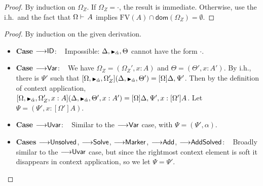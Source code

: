 \documentclass[a4paper]{article}
\newcommand{\smallblacktriangle}{\text{\textscale{0.7}{$\blacktriangleright$}}}
\def\CompactJudgments{0}
\newcommand{\entails}{\mathrel{\ifnum\CompactJudgments=1\vdash \else \vdash\,\fi}}
\newcommand{\MonnierCommaSym}{{\smallblacktriangle}}
\newcommand{\MonnierComma}[1]{{\MonnierCommaSym}_{#1}}
\newcommand{\FV}[1]{\mathrm{FV}(#1)}
\newcommand{\ProofCaseRule}[1]{\item \textbf{Case }\textrm{{#1}}: ~ }
\newcommand{\ProofCasesRules}[1]{\item \textbf{Cases }\textrm{{#1}}: ~ }
\newcommand{\xdom}{\mathsf{dom}}
\newcommand{\dom}[1]{\xdom(#1)}
\newcommand{\sect}{\mathrel{\cap}}
\newcommand{\extendssym}{\longrightarrow}
\newcommand{\judgetp}[2]{{#1} \entails {#2}}
\newcommand{\ahat}{\hat{\alpha}}
\newcommand{\rulename}[1]{\text{\normalfont\textsf{#1}}}
\newcommand{\substextendrulename}[1]{\ensuremath{{\extendssym}{\rulename{#1}}}\xspace}
\newcommand{\substextendId}{\substextendrulename{ID}}
\newcommand{\substextendUU}{\substextendrulename{Uvar}}
\newcommand{\substextendVV}{\substextendrulename{Var}}
\newcommand{\substextendEE}{\substextendrulename{Unsolved}}
\newcommand{\substextendMonMon}{\substextendrulename{Marker}}
\newcommand{\substextendSolve}{\substextendrulename{Solve}}
\newcommand{\substextendAdd}{\substextendrulename{Add}}
\newcommand{\substextendAddSolved}{\substextendrulename{AddSolved}}
\begin{document}
\substitutionstability*
\begin{proof}
  By induction on $\Omega_Z$.
If $\Omega_Z = \cdot$, the result is immediate.
  Otherwise, use the i.h.\ and the fact that
  $\judgetp{\Omega}{A}$ implies $\FV{A} \sect \dom{\Omega_Z} = \emptyset$.
\end{proof}

\contextpartitioning*
\begin{proof}
  By induction on the given derivation.
  
  \begin{itemize}
      \ProofCaseRule{\substextendId}   Impossible: $\Delta, \MonnierComma{\ahat}, \Theta$ cannot have the form $\cdot$.

      \ProofCaseRule{\substextendVV}  We have $\Omega_Z = (\Omega_Z', x : A)$ and $\Theta = (\Theta', x : A')$.
        By i.h., there is $\Psi'$ such that 
        $[\Omega, \MonnierComma{\ahat}, \Omega_Z'](\Delta, \MonnierComma{\ahat}, \Theta')
       =
       [\Omega]\Delta, \Psi'$.  Then by the definition of context application,
       $[\Omega, \MonnierComma{\ahat}, \Omega_Z', x : A](\Delta, \MonnierComma{\ahat}, \Theta', x : A')
      = [\Omega]\Delta, \Psi', x : [\Omega']A$.  Let $\Psi = (\Psi', x : [\Omega']A)$.

      \ProofCaseRule{\substextendUU}  Similar to the \substextendVV case, with $\Psi = (\Psi', \alpha)$.

      \ProofCasesRules{\substextendEE, \substextendSolve, \substextendMonMon, \substextendAdd, \substextendAddSolved}
        Broadly similar to the \substextendUU case, but since the rightmost context element is soft it disappears in context application,
        so we let $\Psi = \Psi'$.
  \qedhere
  \end{itemize}
\end{proof}
\end{document}

